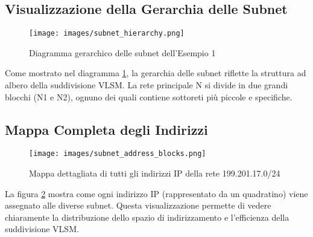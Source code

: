 \subsection{Visualizzazione della Gerarchia delle Subnet}

\begin{figure}[H]
\centering
\texttt{[image: images/subnet\_hierarchy.png]}
\caption{Diagramma gerarchico delle subnet dell'Esempio 1}
\label{fig:subnet_hierarchy}
\end{figure}

Come mostrato nel diagramma \ref{fig:subnet_hierarchy}, la gerarchia delle subnet riflette la struttura ad albero della suddivisione VLSM. La rete principale N si divide in due grandi blocchi (N1 e N2), ognuno dei quali contiene sottoreti più piccole e specifiche.

\subsection{Mappa Completa degli Indirizzi}

\begin{figure}[H]
\centering
\texttt{[image: images/subnet\_address\_blocks.png]}
\caption{Mappa dettagliata di tutti gli indirizzi IP della rete 199.201.17.0/24}
\label{fig:subnet_blocks}
\end{figure}

La figura \ref{fig:subnet_blocks} mostra come ogni indirizzo IP (rappresentato da un quadratino) viene assegnato alle diverse subnet. Questa visualizzazione permette di vedere chiaramente la distribuzione dello spazio di indirizzamento e l'efficienza della suddivisione VLSM.

